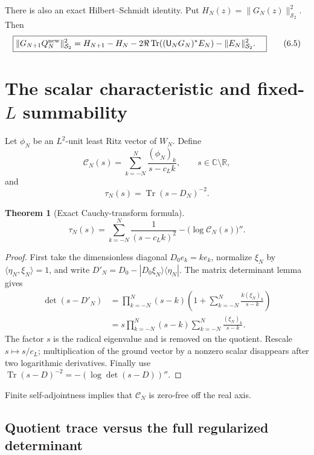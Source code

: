 \documentclass[11pt]{amsart}
\newtheorem{theorem}{Theorem}[section]
\theoremstyle{definition}
\theoremstyle{remark}
\newcommand{\C}{\mathbb C}
\newcommand{\R}{\mathbb R}
\newcommand{\Schatten}{\mathcal S}
\newcommand{\Tr}{\operatorname{Tr}}
\begin{document}
There is also an exact Hilbert--Schmidt identity.  Put
\(H_N(z)=\|G_N(z)\|_{\Schatten_2}^2\).  Then
\[
\boxed{
\begin{aligned}
\|G_{N+1}Q_N^{\rm new}\|_{\Schatten_2}^2
={}&H_{N+1}-H_N
-2\Re\Tr((\mathsf U_NG_N)^*E_N)-\|E_N\|_{\Schatten_2}^2.
\end{aligned}}
\tag{6.5}
\]

\section{The scalar characteristic and fixed-\texorpdfstring{\(L\)}{L}
summability}
\label{sec:summability}

Let \(\phi_N\) be an \(L^2\)-unit least Ritz vector of \(W_N\).  Define
\[
 \mathcal C_N(s)=\sum_{k=-N}^{N}\frac{(\phi_N)_k}{s-c_Lk},
 \qquad s\in\C\setminus\R,
\tag{7.1}
\]
and
\[
 \tau_N(s)=\Tr(s-D_N)^{-2}.
\tag{7.2}
\]

\begin{theorem}[Exact Cauchy-transform formula]
\[
\boxed{
 \tau_N(s)=\sum_{k=-N}^{N}\frac{1}{(s-c_Lk)^2}
            -\bigl(\log\mathcal C_N(s)\bigr)''.}
\tag{7.3}
\]
\end{theorem}

\begin{proof}
First take the dimensionless diagonal \(D_0e_k=ke_k\), normalize
\(\xi_N\) by \(\langle\eta_N,\xi_N\rangle=1\), and write
\(D'_N=D_0-|D_0\xi_N\rangle\langle\eta_N|\).  The matrix determinant
lemma gives
\[
\begin{aligned}
\det(s-D'_N)
&=\prod_{k=-N}^{N}(s-k)
  \left(1+\sum_{k=-N}^{N}\frac{k(\xi_N)_k}{s-k}\right)\\
&=s\prod_{k=-N}^{N}(s-k)
  \sum_{k=-N}^{N}\frac{(\xi_N)_k}{s-k}.
\end{aligned}
\tag{7.4}
\]
The factor \(s\) is the radical eigenvalue and is removed on the quotient.
Rescale \(s\mapsto s/c_L\); multiplication of the ground vector by a
nonzero scalar disappears after two logarithmic derivatives.  Finally use
\(\Tr(s-D)^{-2}=-(\log\det(s-D))''\).
\end{proof}

Finite self-adjointness implies that \(\mathcal C_N\) is zero-free off the
real axis.

\subsection{Quotient trace versus the full regularized determinant}
\end{document}
